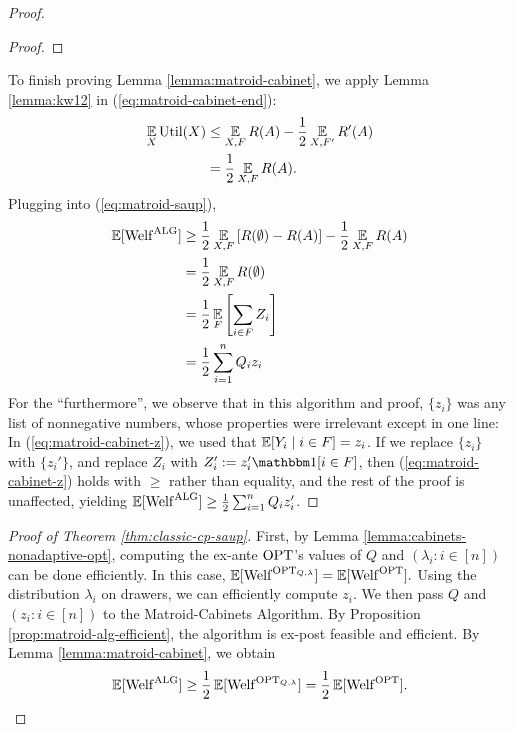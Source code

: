 \begin{proof}
\begin{proof}
  \end{proof}
  To finish proving Lemma \ref{lemma:matroid-cabinet}, we apply Lemma \ref{lemma:kw12} in (\ref{eq:matroid-cabinet-end}):
  \begin{align*}
    \operatorname*{\mathbb{E}}_X \text{Util}(X)
    &\leq \operatorname*{\mathbb{E}}_{X,F} R(A) - \frac{1}{2} \operatorname*{\mathbb{E}}_{X,F'} R'(A)  \\
    &=    \frac{1}{2} \operatorname*{\mathbb{E}}_{X,F} R(A) .
  \end{align*}
  Plugging into (\ref{eq:matroid-saup}),
  \begin{align*}
    \operatorname*{\mathbb{E}}[ \mathrm{Welf}^{\mathrm{ALG}} ]
    &\geq \frac{1}{2} \operatorname*{\mathbb{E}}_{X,F} \left[ R(\emptyset) - R(A) \right] - \frac{1}{2} \operatorname*{\mathbb{E}}_{X,F} R(A)  \\
    &=    \frac{1}{2} \operatorname*{\mathbb{E}}_{X,F} R(\emptyset)  \\
    &=    \frac{1}{2} \operatorname*{\mathbb{E}}_F \left[\sum_{i \in F} Z_i \right] \\
    &=    \frac{1}{2} \sum_{i=1}^n Q_i z_i  
  \end{align*}
  For the ``furthermore'', we observe that in this algorithm and proof, $\{z_i\}$ was any list of nonnegative numbers, whose properties were irrelevant except in one line: In (\ref{eq:matroid-cabinet-z}), we used that $\operatorname*{\mathbb{E}}[Y_i \mid i \in F] = z_i$.
  If we replace $\{z_i\}$ with $\{z_i'\}$, and replace $Z_i$ with $Z_i' := z_i' \Indic{i \in F}$, then (\ref{eq:matroid-cabinet-z}) holds with $\geq$ rather than equality, and the rest of the proof is unaffected, yielding $\operatorname*{\mathbb{E}}[ \mathrm{Welf}^{\mathrm{ALG}}] \geq \frac{1}{2} \sum_{i=1}^n Q_i z_i'$.
\end{proof}

\begin{proof}[Proof of Theorem \ref{thm:classic-cp-saup}]
  First, by Lemma \ref{lemma:cabinets-nonadaptive-opt}, computing the ex-ante $\mathrm{OPT}$'s values of $Q$ and $(\lambda_i : i \in [n])$ can be done efficiently.
  In this case, $\operatorname*{\mathbb{E}}[ \mathrm{Welf}^{\mathrm{OPT}_{Q,\lambda}}] = \operatorname*{\mathbb{E}}[\mathrm{Welf}^{\mathrm{OPT}}].$
  Using the distribution $\lambda_i$ on drawers, we can efficiently compute $z_i$.
  We then pass $Q$ and $(z_i : i \in [n])$ to the Matroid-Cabinets Algorithm.
  By Proposition \ref{prop:matroid-alg-efficient}, the algorithm is ex-post feasible and efficient.
  By Lemma \ref{lemma:matroid-cabinet}, we obtain
  \[ \operatorname*{\mathbb{E}}[ \mathrm{Welf}^{\mathrm{ALG}} ] \geq \frac{1}{2} \operatorname*{\mathbb{E}}[ \mathrm{Welf}^{\mathrm{OPT}_{Q,\lambda}} ] = \frac{1}{2} \operatorname*{\mathbb{E}}[ \mathrm{Welf}^{\mathrm{OPT}}] . \]
\end{proof}





